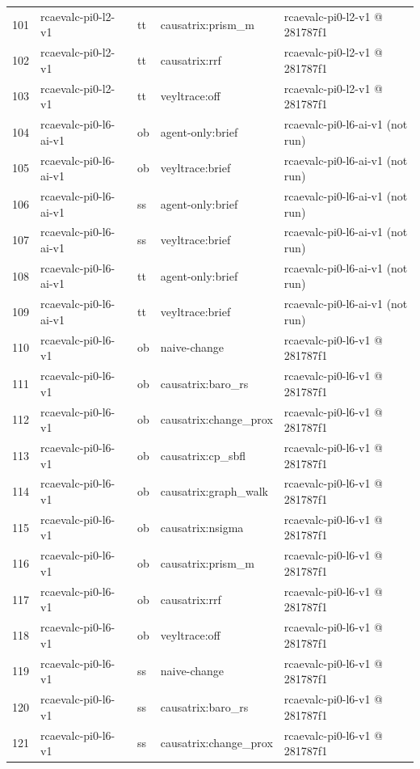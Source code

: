 \begin{longtable}{@{}r>{\raggedright\arraybackslash}p{87.0pt}>{\raggedright\arraybackslash}p{18.0pt}>{\raggedright\arraybackslash}p{63.0pt}>{\raggedright\arraybackslash}p{108.0pt}@{}}
101 & rcaevalc-pi0-l2-v1 & tt & causatrix:prism\_m & rcaevalc-pi0-l2-v1 @ 281787f1 \\
102 & rcaevalc-pi0-l2-v1 & tt & causatrix:rrf & rcaevalc-pi0-l2-v1 @ 281787f1 \\
103 & rcaevalc-pi0-l2-v1 & tt & veyltrace:off & rcaevalc-pi0-l2-v1 @ 281787f1 \\
104 & rcaevalc-pi0-l6-ai-v1 & ob & agent-only:brief & rcaevalc-pi0-l6-ai-v1 (not run) \\
105 & rcaevalc-pi0-l6-ai-v1 & ob & veyltrace:brief & rcaevalc-pi0-l6-ai-v1 (not run) \\
106 & rcaevalc-pi0-l6-ai-v1 & ss & agent-only:brief & rcaevalc-pi0-l6-ai-v1 (not run) \\
107 & rcaevalc-pi0-l6-ai-v1 & ss & veyltrace:brief & rcaevalc-pi0-l6-ai-v1 (not run) \\
108 & rcaevalc-pi0-l6-ai-v1 & tt & agent-only:brief & rcaevalc-pi0-l6-ai-v1 (not run) \\
109 & rcaevalc-pi0-l6-ai-v1 & tt & veyltrace:brief & rcaevalc-pi0-l6-ai-v1 (not run) \\
110 & rcaevalc-pi0-l6-v1 & ob & naive-change & rcaevalc-pi0-l6-v1 @ 281787f1 \\
111 & rcaevalc-pi0-l6-v1 & ob & causatrix:baro\_rs & rcaevalc-pi0-l6-v1 @ 281787f1 \\
112 & rcaevalc-pi0-l6-v1 & ob & causatrix:change\_prox & rcaevalc-pi0-l6-v1 @ 281787f1 \\
113 & rcaevalc-pi0-l6-v1 & ob & causatrix:cp\_sbfl & rcaevalc-pi0-l6-v1 @ 281787f1 \\
114 & rcaevalc-pi0-l6-v1 & ob & causatrix:graph\_walk & rcaevalc-pi0-l6-v1 @ 281787f1 \\
115 & rcaevalc-pi0-l6-v1 & ob & causatrix:nsigma & rcaevalc-pi0-l6-v1 @ 281787f1 \\
116 & rcaevalc-pi0-l6-v1 & ob & causatrix:prism\_m & rcaevalc-pi0-l6-v1 @ 281787f1 \\
117 & rcaevalc-pi0-l6-v1 & ob & causatrix:rrf & rcaevalc-pi0-l6-v1 @ 281787f1 \\
118 & rcaevalc-pi0-l6-v1 & ob & veyltrace:off & rcaevalc-pi0-l6-v1 @ 281787f1 \\
119 & rcaevalc-pi0-l6-v1 & ss & naive-change & rcaevalc-pi0-l6-v1 @ 281787f1 \\
120 & rcaevalc-pi0-l6-v1 & ss & causatrix:baro\_rs & rcaevalc-pi0-l6-v1 @ 281787f1 \\
121 & rcaevalc-pi0-l6-v1 & ss & causatrix:change\_prox & rcaevalc-pi0-l6-v1 @ 281787f1 \\

\end{longtable}
